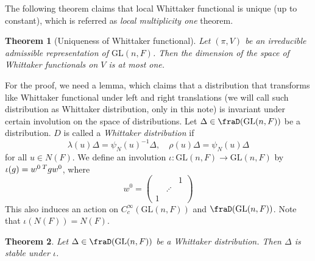 \documentclass{article}
\newtheorem{theorem}{Theorem}[section]
\newcommand{\pre}[1]{\prescript{#1}{}}
\newcommand{\GL}{\mathrm{GL}}
\begin{document}
The following theorem claims that local Whittaker functional is unique (up to constant), which is referred as \emph{local multiplicity one} theorem. 
\begin{theorem}[Uniqueness of Whittaker functional]
\label{nonarchmultone}
Let $(\pi, V)$ be an irreducible admissible representation of $\GL(n, F)$. Then the dimension of the space of Whittaker functionals on $V$ is at most one. 
\end{theorem}

For the proof, we need a lemma, which claims that a distribution that transforms like Whittaker functional under left and right translations (we will call such distribution as Whittaker distribution, only in this note) is invariant under certain involution on the space of distributions. 
Let $\Delta\in\fraD(\GL(n, F))$ be a distribution. $D$ is called a \emph{Whittaker distribution} if 
$$
\lambda(u) \Delta = \psi_{N}(u)^{-1}\Delta, \quad \rho(u)\Delta = \psi_{N}(u)\Delta
$$
for all $u\in N(F)$. 
We define an involution $\iota:\GL(n, F) \to \GL(n, F)$ by $\iota(g) = w^{0}\pre{T}{}gw^{0}$, where 
$$
w^{0} =\begin{pmatrix} & & 1 \\ & \iddots & \\1 & & \end{pmatrix}
$$
This also induces an action on $C^{\infty}_{c}(\GL(n, F))$ and $\fraD(\GL(n, F))$. Note that $\iota(N(F)) = N(F)$. 
\begin{theorem}
Let $\Delta\in \fraD(\GL(n, F))$ be a Whittaker distribution. Then $\Delta$ is stable under $\iota$. 
\end{theorem}
\end{document}
